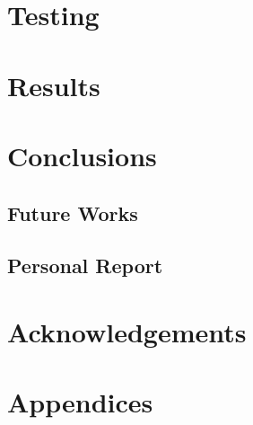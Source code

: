 \documentclass[a4paper]{article}
\begin{document}
            
        
        
    
    \section{Testing}
    
    \section{Results}
    
    \section{Conclusions}
    
        \subsection{Future Works}
        
        \subsection{Personal Report}
    
    \section{Acknowledgements}
    
    \section{Appendices}
    
    
    
    \nocite{*}
    
\end{document}
